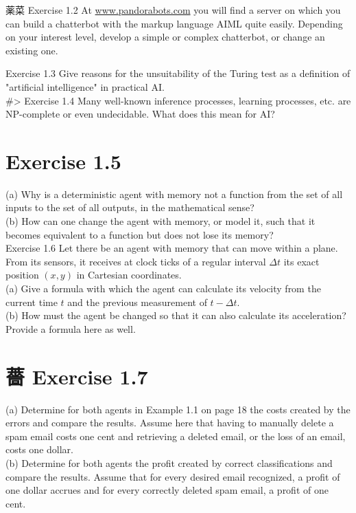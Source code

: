 \documentclass[10pt]{article}
\begin{document}
薬菜 Exercise 1.2 At \href{http://www.pandorabots.com}{www.pandorabots.com} you will find a server on which you can build a chatterbot with the markup language AIML quite easily. Depending on your interest level, develop a simple or complex chatterbot, or change an existing one.

Exercise 1.3 Give reasons for the unsuitability of the Turing test as a definition of "artificial intelligence" in practical AI.\\
\#> Exercise 1.4 Many well-known inference processes, learning processes, etc. are NP-complete or even undecidable. What does this mean for AI?

\section*{Exercise 1.5}
(a) Why is a deterministic agent with memory not a function from the set of all inputs to the set of all outputs, in the mathematical sense?\\
(b) How can one change the agent with memory, or model it, such that it becomes equivalent to a function but does not lose its memory?\\
Exercise 1.6 Let there be an agent with memory that can move within a plane. From its sensors, it receives at clock ticks of a regular interval $\Delta t$ its exact position $(x, y)$ in Cartesian coordinates.\\
(a) Give a formula with which the agent can calculate its velocity from the current time $t$ and the previous measurement of $t-\Delta t$.\\
(b) How must the agent be changed so that it can also calculate its acceleration? Provide a formula here as well.

\section*{薔 Exercise 1.7}
(a) Determine for 
both agents in Example 1.1 on page 18 the costs created by the errors and compare the results. Assume here that having to manually delete a spam email costs one cent and retrieving a deleted email, or the loss of an email, costs one dollar.\\
(b) Determine for both agents the profit created by correct classifications and compare the results. Assume that for every desired email recognized, a profit of one dollar accrues and for every correctly deleted spam email, a profit of one cent.
\end{document}

